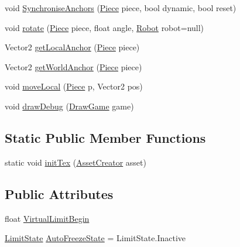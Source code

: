 \begin{DoxyCompactItemize}
\item 
void \hyperlink{classgearit_1_1src_1_1robot_1_1_revolute_spot_aaaa8f29d01045c4c832f984004912add}{Synchronise\+Anchors} (\hyperlink{classgearit_1_1src_1_1robot_1_1_piece}{Piece} piece, bool dynamic, bool reset)
\item 
void \hyperlink{classgearit_1_1src_1_1robot_1_1_revolute_spot_ab1a206e687b3400b63de82b9c1da622d}{rotate} (\hyperlink{classgearit_1_1src_1_1robot_1_1_piece}{Piece} piece, float angle, \hyperlink{classgearit_1_1src_1_1robot_1_1_robot}{Robot} robot=null)
\item 
Vector2 \hyperlink{classgearit_1_1src_1_1robot_1_1_revolute_spot_a60e1f691bf05a9819a0b1d32b2d22658}{get\+Local\+Anchor} (\hyperlink{classgearit_1_1src_1_1robot_1_1_piece}{Piece} piece)
\item 
Vector2 \hyperlink{classgearit_1_1src_1_1robot_1_1_revolute_spot_afba860acdd930c42d5d46e60bfd67f6a}{get\+World\+Anchor} (\hyperlink{classgearit_1_1src_1_1robot_1_1_piece}{Piece} piece)
\item 
void \hyperlink{classgearit_1_1src_1_1robot_1_1_revolute_spot_a341ad56b373e7a4150564a9195cf8f86}{move\+Local} (\hyperlink{classgearit_1_1src_1_1robot_1_1_piece}{Piece} p, Vector2 pos)
\item 
void \hyperlink{classgearit_1_1src_1_1robot_1_1_revolute_spot_a519b0d5fdaf431f2f5f5bc71ef73429f}{draw\+Debug} (\hyperlink{classgearit_1_1src_1_1_draw_game}{Draw\+Game} game)
\end{DoxyCompactItemize}
\subsection*{Static Public Member Functions}
\begin{DoxyCompactItemize}
\item 
static void \hyperlink{classgearit_1_1src_1_1robot_1_1_revolute_spot_a625d49c6cffc16603c6ae22b16d3830d}{init\+Tex} (\hyperlink{classgearit_1_1src_1_1utility_1_1_asset_creator}{Asset\+Creator} asset)
\end{DoxyCompactItemize}
\subsection*{Public Attributes}
\begin{DoxyCompactItemize}
\item 
float \hyperlink{classgearit_1_1src_1_1robot_1_1_revolute_spot_a04645244f06d643f059fd8dd31cccdce}{Virtual\+Limit\+Begin}
\item 
\hyperlink{namespace_farseer_physics_1_1_dynamics_1_1_joints_a31a093d39ac5f01671837f083d915a35}{Limit\+State} \hyperlink{classgearit_1_1src_1_1robot_1_1_revolute_spot_aad3f7f2c138250daaa4479bf3dd0e74b}{Auto\+Freeze\+State} = Limit\+State.\+Inactive
\end{DoxyCompactItemize}
